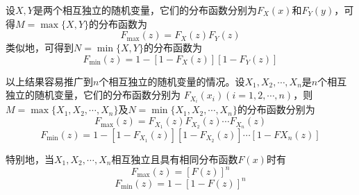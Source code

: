 \begin{definition}[$M=\max\{X,Y\}$分布及$N=\min\{X,Y\}$分布]
    设$X,Y$是两个相互独立的随机变量，它们的分布函数分别为$F_X(x)$和$F_Y(y)$，可得$M=\max\{X,Y\}$的分布函数为
    $$F_{\max}(z)=F_X(z)F_Y(z)$$
    类似地，可得到$N=\min\{X,Y\}$的分布函数为
    $$F_{\min}(z)=1-[1-F_X(z)][1-F_Y(z)]$$

    以上结果容易推广到$n$个相互独立的随机变量的情况。设$X_1,X_2,\cdots,X_n$是$n$个相互独立的随机变量，它们的分布函数分别为
    $F_{X_i}(x_i)(i=1,2,\cdots,n)$，则$M=\max\{X_1,X_2,\cdots,X_n\}$及$N=\min\{X_1,X_2,\cdots,X_n\}$的分布函数分别为
    $$F_{\max}(z)=F_{X_1}(z)F_{X_2}(z)\cdots F_{X_n}(z)$$
    $$F_{\min}(z)=1-[1-F_{X_1}(z)][1-F_{X_2}(z)]\cdots [1-F{X_n}(z)]$$

    特别地，当$X_1,X_2,\cdots,X_n$相互独立且具有相同分布函数$F(x)$时有
    $$F_{\max}(z)=[F(z)]^n$$
    $$F_{\min}(z)=1-[1-F(z)]^n$$
\end{definition}
